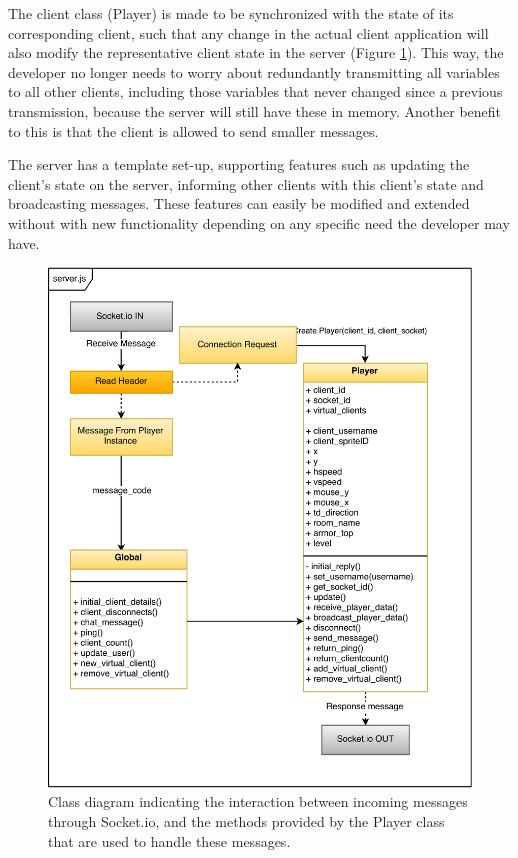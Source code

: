 \documentclass[bsc, 12pt, twoside, singlespacing, parskip, abbrevs, notimes, normalheadings, logo]{styles/infthesis}
\begin{document}
The client class (Player) is made to be synchronized with the state of its corresponding client, such that any change in the actual client application will also modify the representative client state in the server (Figure \ref{fig:server_player_construct}). This way, the developer no longer needs to worry about redundantly transmitting all variables to all other clients, including those variables that never changed since a previous transmission, because the server will still have these in memory. Another benefit to this is that the client is allowed to send smaller messages.

The server has a template set-up, supporting features such as updating the client's state on the server, informing other clients with this client's state and broadcasting messages. These features can easily be modified and extended without with new functionality depending on any specific need the developer may have.

\begin{figure}[H]
\includegraphics[scale=1]{images/server_class_diagram.eps}
\caption{Class diagram indicating the interaction between incoming messages through Socket.io, and the methods provided by the Player class that are used to handle these messages.}
\label{fig:server_player_construct}
\vspace{1em}
\end{figure}
\end{document}
